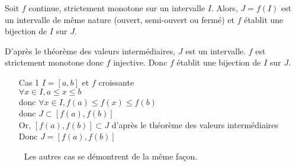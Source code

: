 \begin{thm}

	Soit $f$ continue, strictement monotone sur un intervalle $I$.
	Alors, $J = f(I)$ est un intervalle de même nature (ouvert, semi-ouvert ou fermé) et $f$ établit une bijection de $I$ sur $J$.
\end{thm}

\begin{prv}
	D'après le théorème des valeurs intermédiaires, $J$ est un intervalle.
	$f$ est strictement monotone donc $f$ injective.
	Donc $f$ établit une bijection de $I$ sur $J$.\\

	\begin{itemize}
		\item[\sc Cas 1] $I = [a,b]$ et $f$ croissante\\
			$\forall x \in I, a \le x \le b$\\
			donc  $\forall x \in I, f(a) \le f(x) \le f(b)$ \\
			donc $J \subset [f(a), f(b)]$\\
			Or, $[f(a), f(b)] \subset J$ d'après le théorème des valeurs intermédiaires\\
			Donc $J = [f(a), f(b)]$
	\end{itemize}
	~~~~ Les autres cas se démontrent de la même fa\c con.
\end{prv}

